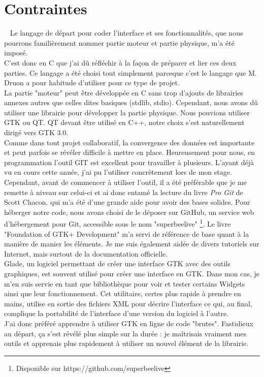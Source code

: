 \documentclass[11pt,french,a4paper]{report}
\begin{document}
    \section{Contraintes} 
Le langage de départ pour coder l'interface et ses fonctionnalités, que nous pourrons familièrement nommer partie moteur 
et partie physique, m'a été imposé. \\
C'est donc en C que j'ai dû réfléchir à la façon de préparer et lier ces deux parties. Ce langage a été choisi tout simplement 
parceque c'est  le langage que M. Druon a pour habitude d'utiliser pour ce type de projet. \\
La partie "moteur" peut être développée en C sans trop d'ajouts de librairies annexes autres que celles dites basiques 
(stdlib, stdio). 
Cependant, nous avons dû utiliser une librairie pour développer la partie physique. Nous pouvions utiliser GTK ou QT. 
QT devant être utilisé en C++, notre choix s'est naturellement dirigé vers GTK 3.0. \\

Comme dans tout projet collaboratif, la convergence des données est importante et peut parfois se révéler difficile à mettre en place. 
Heureusement pour nous, en programmation l'outil GIT est excellent pour travailler à plusieurs. L'ayant déjà vu en cours cette année,
j'ai pu l'utiliser concrètement lors de mon stage. Cependant, avant de commencer à utiliser l'outil, il a été préférable que 
je me remette à niveau sur celui-ci et ai donc entamé la lecture du livre \textit{Pro Git} de Scott Chacon. %
qui m'a été d'une grande aide pour avoir des bases solides. Pour héberger notre code, nous avons choisi de le déposer sur GitHub,
un service web d'hébergement pour Git, accessible sous le nom "superbeelive" \footnote{Disponible sur https://github.com/superbeelive}.
Le livre "Foundation of GTK+ Development" m'a servi de référence de base quant à la manière de manier les éléments. 
Je me suis également aidée de divers tutoriels sur Internet, mais surtout de la documentation officielle. %
\\

Glade, un logiciel permettant de créer une interface GTK avec des outils graphiques, est souvent utilisé pour créer une interface
en GTK.
Dans mon cas, je m'en suis servie en tant que bibliothèque pour voir et tester certains Widgets ainsi que leur fonctionnement.
Cet utilitaire, certes plus rapide à prendre en mains, utilise en sortie des fichiers XML pour décrire l'interface ce qui, 
au final, complique la portabilité de l'interface d'une version du logiciel à l'autre. \\ 
J'ai donc préféré apprendre à utiliser GTK en ligne de code "brutes". Fastidieux au départ, 
ça s'est révélé plus simple sur la durée : je maîtrisais vraiment mes outils et apprenais plus rapidement à utiliser 
un nouvel élément de la librairie.  
\end{document}
